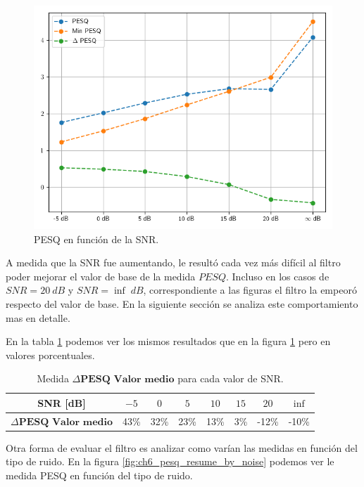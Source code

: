 \begin{figure}
	\centering
	\centerline{\includegraphics[scale=0.75]{images/ch6/af/objective_metrics/metric_PESQ.png}}
	\caption{PESQ en función de la SNR.}
	\label{fig:ch6_pesq_resume}
\end{figure}

A medida que la SNR fue aumentando, le resultó cada vez más difícil al filtro poder mejorar el valor de base de la medida $PESQ$. Incluso en los casos de $SNR = \SI{20}{dB}$ y $SNR = \inf \; dB$, correspondiente a las figuras el filtro la empeoró respecto del valor de base. En la siguiente sección se analiza este comportamiento mas en detalle.

En la tabla \ref{table:pesq_resume} podemos ver los mismos resultados que en la figura \ref{fig:ch6_pesq_resume} pero en valores porcentuales.

\begin{table}[ht]
	\centering
	\begin{tabular}{ |c|c|c|c|c|c|c|c| } 
		\hline
		SNR [dB] & $-5$ & $0$ & $5$ & $10$ & $15$ & $20$ & $\inf$ \\ 
		\hline
		$\Delta \textbf{PESQ Valor medio}$ & 43\%  & 32\% & 23\% & 13\% & 3\% & -12\% & -10\% \\ 
		\hline
	\end{tabular}
	\caption{Medida $\Delta \textbf{PESQ Valor medio}$ para cada valor de SNR.}
	\label{table:pesq_resume}
\end{table}

Otra forma de evaluar el filtro es analizar como varían las medidas en función del tipo de ruido. En la figura \ref{fig:ch6_pesq_resume_by_noise} podemos ver le medida PESQ en función del tipo de ruido.


